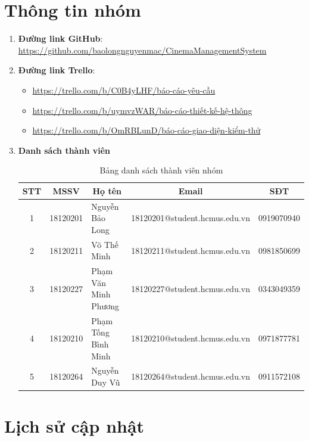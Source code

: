\documentclass[a4paper, 12pt]{article}
\begin{document}
\section{Thông tin nhóm}
\label{sec:info}
\begin{enumerate}
	\item \textbf{Đường link GitHub}: \url{https://github.com/baolongnguyenmac/CinemaManagementSystem}
	\item \textbf{Đường link Trello}: 
\begin{itemize} 
\item \url{https://trello.com/b/C0B4yLHF/báo-cáo-yêu-cầu} 
\item \url{https://trello.com/b/uymvzWAR/báo-cáo-thiết-kế-hệ-thông} 
\item \url{https://trello.com/b/OmRBLunD/báo-cáo-giao-diện-kiểm-thử} 
\end{itemize}

	\item \textbf{Danh sách thành viên}
	\begin{table}[H]
		\begin{center}
			\begin{tabular}{|c|c|l|c|c|}
				\hline
				STT & MSSV     & \multicolumn{1}{c|}{Họ tên} & Email                         & SĐT        \\ \hline
				1   & 18120201 & Nguyễn Bảo Long             & 18120201@student.hcmus.edu.vn & 0919070940 \\ \hline
				2   & 18120211 & Võ Thế Minh                 & 18120211@student.hcmus.edu.vn & 0981850699 \\ \hline
				3   & 18120227 & Phạm Văn Minh Phương        & 18120227@student.hcmus.edu.vn & 0343049359 \\ \hline
				4   & 18120210 & Phạm Tống Bình Minh         & 18120210@student.hcmus.edu.vn & 0971877781 \\ \hline
				5   & 18120264 & Nguyễn Duy Vũ               & 18120264@student.hcmus.edu.vn & 0911572108 \\ \hline
			\end{tabular}
			\caption{Bảng danh sách thành viên nhóm}
		\end{center}
	\end{table}
\end{enumerate}
\clearpage

\section{Lịch sử cập nhật}
\label{sec:history}
\end{document}

